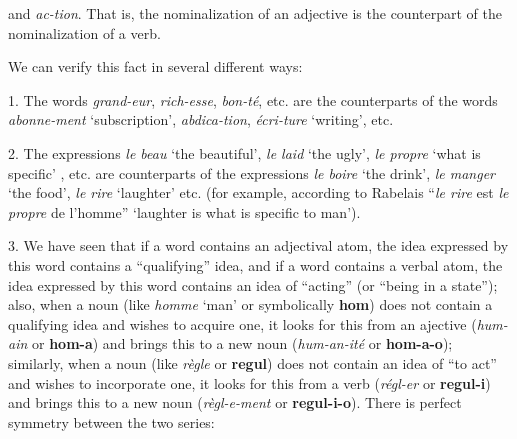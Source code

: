 \begin{sloppypar}
{}
%
{\noindent
  and \emph{ac-tion}. That is, the nominalization of an adjective is
  the counterpart of the nominalization of a verb.

  We can verify this fact in several different ways:

  1. The words \emph{grand-eur}, \emph{rich-esse}, \emph{bon-té}, etc. are
  the counterparts of the words \emph{abonne-ment} `subscription',
  \emph{abdica-tion}, \emph{écri-ture} `writing', etc.

  2. The expressions \emph{le beau} `the beautiful', \emph{le laid} `the ugly',
  \emph{le propre} `what is specific' , etc. are counterparts of the
  expressions \emph{le boire} `the drink', \emph{le manger} `the food', \emph{le
  rire} `laughter' etc. (for example, according to Rabelais
  ``\emph{le rire} est \emph{le propre} de l'homme'' `laughter is what
  is specific to man').

  3. We have seen that if a word contains an adjectival atom, the idea
  expressed by this word contains a ``qualifying'' idea, and if a word
  contains a verbal atom, the idea expressed by this word contains an
  idea of ``acting'' (or ``being in a state''); also, when a noun
  (like \emph{homme} `man' or symbolically \textbf{hom}) does not
  contain a qualifying idea and wishes to acquire one, it looks for
  this from an ajective (\emph{hum-ain} or \textbf{hom-a}) and brings
  this to a new noun (\emph{hum-an-ité} or \textbf{hom-a-o});
  similarly, when a noun (like \emph{règle} or \textbf{regul}) does
  not contain an idea of ``to act'' and wishes to incorporate one, it
  looks for this from a verb (\emph{régl-er} or \textbf{regul-i}) and
  brings this to a new noun (\emph{règl-e-ment} or
  \textbf{regul-i-o}). There is perfect symmetry between the two
  series:
 
}

\end{sloppypar}
